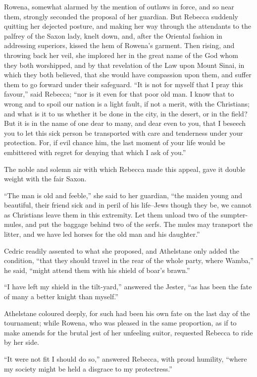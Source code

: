 Rowena, somewhat alarmed by the mention of outlaws in force, and so near
them, strongly seconded the proposal of her guardian. But Rebecca
suddenly quitting her dejected posture, and making her way through the
attendants to the palfrey of the Saxon lady, knelt down, and, after the
Oriental fashion in addressing superiors, kissed the hem of Rowena's
garment. Then rising, and throwing back her veil, she implored her in
the great name of the God whom they both worshipped, and by that
revelation of the Law upon Mount Sinai, in which they both believed,
that she would have compassion upon them, and suffer them to go forward
under their safeguard. ``It is not for myself that I pray this favour,''
said Rebecca; ``nor is it even for that poor old man. I know that to
wrong and to spoil our nation is a light fault, if not a merit, with the
Christians; and what is it to us whether it be done in the city, in the
desert, or in the field? But it is in the name of one dear to many, and
dear even to you, that I beseech you to let this sick person be
transported with care and tenderness under your protection. For, if evil
chance him, the last moment of your life would be embittered with regret
for denying that which I ask of you.''

The noble and solemn air with which Rebecca made this appeal, gave it
double weight with the fair Saxon.

``The man is old and feeble,'' she said to her guardian, ``the maiden
young and beautiful, their friend sick and in peril of his life--Jews
though they be, we cannot as Christians leave them in this extremity.
Let them unload two of the sumpter-mules, and put the baggage behind two
of the serfs. The mules may transport the litter, and we have led horses
for the old man and his daughter.''

Cedric readily assented to what she proposed, and Athelstane only added
the condition, ``that they should travel in the rear of the whole party,
where Wamba,'' he said, ``might attend them with his shield of boar's
brawn.''

``I have left my shield in the tilt-yard,'' answered the Jester, ``as
has been the fate of many a better knight than myself.''

Athelstane coloured deeply, for such had been his own fate on the last
day of the tournament; while Rowena, who was pleased in the same
proportion, as if to make amends for the brutal jest of her unfeeling
suitor, requested Rebecca to ride by her side.

``It were not fit I should do so,'' answered Rebecca, with proud
humility, ``where my society might be held a disgrace to my
protectress.''

